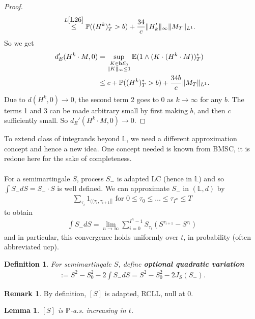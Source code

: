 \documentclass[12pt,a4paper, twoside]{article}
\newtheorem{lem}{Lemma}[section]
\newtheorem{defn}{Definition}[section]
\theoremstyle{definition}
\newtheorem{rem}{Remark}[section]
\newcommand{\EE}{\mathbb{E}} %
\newcommand{\PP}{\mathbb{P}} %
\newcommand{\simple}{\textbf{\text{b}}\mathcal{E}}
\begin{document}
\begin{proof}
\begin{align*}
& \overset{L \ref{L26}}\leq \PP((H^k)_T^* > b) + \frac{34}{c} \|H_k'\|_\infty \|M_T\|_{L^1}.
\end{align*}
So we get
\begin{align*}
d_E' ( H^k \cdot M, 0 ) &= \sup_{\substack{ K \in \simple_0 \\ \|K\|_\infty \leq 1}} \EE(1 \wedge (K \cdot (H^k \cdot M))_T^*) \\
& \leq c + \PP((H^k)_T^* > b) + \frac{34b}{c}\|M_T\|_{L^1}.
\end{align*}
Due to $d(H^k, 0) \to 0$, the second term 2 goes to $0$ as $k \to \infty$ for any $b$. The terms 1 and 3 can be made arbitrary small by first making $b$, and then $c$ sufficiently small. So $d_E'(H^k \cdot M, 0) \to 0$. 
\end{proof}
\newpage
To extend class of integrands beyond $\mathbb{L}$, we need a different approximation concept and hence a new idea. One concept needed is known from BMSC, it is redone here for the sake of completeness. 
\\\\
For a semimartingale $S$, process $S_-$ is adapted LC (hence in $\mathbb{L}$) and so  $\int S_- dS = S_- \cdot S$ is well defined. We can approximate $S_-$ in $( \mathbb{L},d)$ by
\begin{align*}
\sum_{\tau_i} 1_{(\!( \tau_i, \tau_{i+1}]\!]} \text{ for } 0 \leq \tau_0 \leq \dots \leq \tau_{I^n} \leq T
\end{align*}
to obtain
\begin{align*}
\int S_- dS = \lim_{n \to \infty} \sum_{i=0}^{I^n-1} S_{\tau_i}( S^{\tau_{i+1}}- S^{\tau_i})  \tag{for $d_E'$}
\end{align*}
and in particular, this convergence holds uniformly over $t$, in probability (often abbreviated ucp). 
\begin{defn} For semimartingale $S$, define \textbf{optional quadratic variation}
\begin{align*}
[S]:= S^2-S_0^2-2 \int S_- dS = S^2-S_0^2- 2 J_S(S_-).
\end{align*} 
\end{defn}
\begin{rem} By definition, $[S]$ is adapted, RCLL, null at $0$. 
\end{rem}
\begin{lem} \label{L36} $[S]$ is $\PP$-a.s. increasing in $t$. 
\end{lem}
\end{document}
